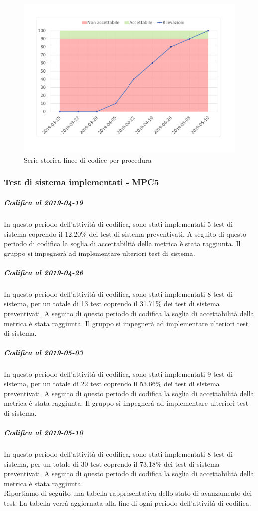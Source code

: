 \begin{figure}[H]
	\centering
	\includegraphics[scale=0.6]{images/resoconto/MPC4Chart.pdf}
	\caption{Serie storica linee di codice per procedura}	
\end{figure}

\subsubsection{Test di sistema implementati - MPC5}
\subparagraph{Codifica al 2019-04-19}
In questo periodo dell'attività di codifica, sono stati implementati 5 test di sistema coprendo il 12.20\% dei test di sistema preventivati.
A seguito di questo periodo di codifica la soglia di accettabilità della metrica è stata raggiunta.
Il gruppo si impegnerà ad implementare ulteriori test di sistema.


\subparagraph{Codifica al 2019-04-26}
In questo periodo dell'attività di codifica, sono stati implementati 8 test di sistema, per un totale di 13 test coprendo il 31.71\% dei test di sistema preventivati.
A seguito di questo periodo di codifica la soglia di accettabilità della metrica è stata raggiunta.
Il gruppo si impegnerà ad implementare ulteriori test di sistema.


\subparagraph{Codifica al 2019-05-03}
In questo periodo dell'attività di codifica, sono stati implementati 9 test di sistema, per un totale di 22 test coprendo il 53.66\% dei test di sistema preventivati.
A seguito di questo periodo di codifica la soglia di accettabilità della metrica è stata raggiunta.
Il gruppo si impegnerà ad implementare ulteriori test di sistema.

\subparagraph{Codifica al 2019-05-10}
In questo periodo dell'attività di codifica, sono stati implementati 8 test di sistema, per un totale di 30 test coprendo il 73.18\% dei test di sistema preventivati.
A seguito di questo periodo di codifica la soglia di accettabilità della metrica è stata raggiunta.
\\
Riportiamo di seguito una tabella rappresentativa dello stato di avanzamento dei test. La tabella verrà aggiornata alla fine di ogni periodo dell'attività di codifica.

